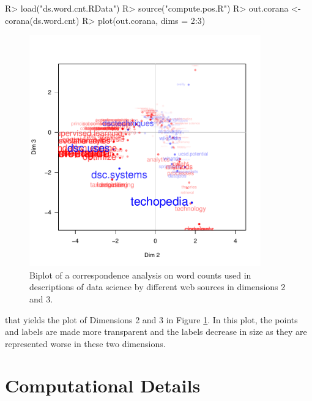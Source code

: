 \documentclass[
]{jdssv}
\begin{document}
\begin{CodeChunk}
\begin{CodeInput}
R> load("ds.word.cnt.RData")
R> source("compute.pos.R")
R> out.corana <- corana(ds.word.cnt)
R> plot(out.corana, dims = 2:3)
\end{CodeInput}
\begin{figure}

{\centering \includegraphics[width=10cm]{JDSSV_editorialprocess_files/figure-latex/ca_biplot_dims23-1} 

}

\caption[Biplot of a correspondence analysis on word counts used in descriptions of data science by different web sources in dimensions 2 and 3]{Biplot of a correspondence analysis on word counts used in descriptions of data science by different web sources in dimensions 2 and 3.}\label{fig:ca_biplot_dims23}
\end{figure}
\end{CodeChunk}

that yields the plot of Dimensions 2 and 3 in Figure
\ref{fig:ca_biplot_dims23}. In this plot, the points and labels are made
more transparent and the labels decrease in size as they are represented
worse in these two dimensions.

\newpage

\hypertarget{computational-details}{%
\section*{Computational Details}\label{computational-details}}
\end{document}
